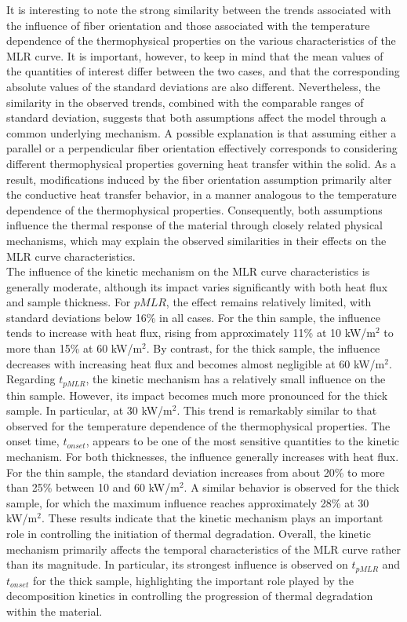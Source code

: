 \documentclass{article}
\begin{document}
It is interesting to note the strong similarity between the trends associated with the influence of fiber orientation and those associated with the temperature dependence of the thermophysical properties on the various characteristics of the MLR curve. It is important, however, to keep in mind that the mean values of the quantities of interest differ between the two cases, and that the corresponding absolute values of the standard deviations are also different. Nevertheless, the similarity in the observed trends, combined with the comparable ranges of standard deviation, suggests that both assumptions affect the model through a common underlying mechanism. A possible explanation is that assuming either a parallel or a perpendicular fiber orientation effectively corresponds to considering different thermophysical properties governing heat transfer within the solid. As a result, modifications induced by the fiber orientation assumption primarily alter the conductive heat transfer behavior, in a manner analogous to the temperature dependence of the thermophysical properties. Consequently, both assumptions influence the thermal response of the material through closely related physical mechanisms, which may explain the observed similarities in their effects on the MLR curve characteristics.\\

The influence of the kinetic mechanism on the MLR curve characteristics is generally moderate, although its impact varies significantly with both heat flux and sample thickness. For $pMLR$, the effect remains relatively limited, with standard deviations below 16\% in all cases. For the thin sample, the influence tends to increase with heat flux, rising from approximately 11\% at 10 kW/m$^2$ to more than 15\% at 60 kW/m$^2$. By contrast, for the thick sample, the influence decreases with increasing heat flux and becomes almost negligible at 60 kW/m$^2$. Regarding $t_{pMLR}$, the kinetic mechanism has a relatively small influence on the thin sample. However, its impact becomes much more pronounced for the thick sample. In particular, at 30 kW/m$^2$. This trend is remarkably similar to that observed for the temperature dependence of the thermophysical properties. The onset time, $t_{onset}$, appears to be one of the most sensitive quantities to the kinetic mechanism. For both thicknesses, the influence generally increases with heat flux. For the thin sample, the standard deviation increases from about 20\% to more than 25\% between 10 and 60 kW/m$^2$. A similar behavior is observed for the thick sample, for which the maximum influence reaches approximately 28\% at 30 kW/m$^2$. These results indicate that the kinetic mechanism plays an important role in controlling the initiation of thermal degradation. Overall, the kinetic mechanism primarily affects the temporal characteristics of the MLR curve rather than its magnitude. In particular, its strongest influence is observed on $t_{pMLR}$ and $t_{onset}$ for the thick sample, highlighting the important role played by the decomposition kinetics in controlling the progression of thermal degradation within the material.
\end{document}
